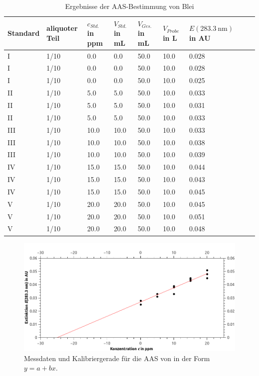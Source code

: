   \begin{table}[H]
    \centering
    \caption[Ergebnisse AAS, Quelle: Autor]{Ergebnisse der AAS-Bestimmung von Blei}
    
    \label{tab:ErgebnisseAAS}   
    \begin{tabular}{@{}l|lllll|lp{4.5cm}l@{}}
      \toprule
      Standard & aliquoter Teil & $c_{Std.}$ in \si{ppm} & $V_{Std.}$ in \si{\milli\liter} & $V_{Ges.}$ in \si{\milli\liter} & $V_{Probe}$ in \si{\liter} & $E\left(\SI[mode=text]{283.3}{\nano\meter}\right)$ in AU \\ \midrule
        I & 1/10 & 0.0 & 0.0 & 50.0 & 10.0 & 0.028 \\
        I & 1/10 & 0.0 & 0.0 & 50.0 & 10.0 & 0.028 \\
        I & 1/10 & 0.0 & 0.0 & 50.0 & 10.0 & 0.025 \\
       II & 1/10 & 5.0 & 5.0 & 50.0 & 10.0 & 0.033 \\
       II & 1/10 & 5.0 & 5.0 & 50.0 & 10.0 & 0.031 \\
       II & 1/10 & 5.0 & 5.0 & 50.0 & 10.0 & 0.033 \\
     III  & 1/10 & 10.0 & 10.0 & 50.0 & 10.0 & 0.033 \\
     III  & 1/10 & 10.0 & 10.0 & 50.0 & 10.0 & 0.038 \\
     III  & 1/10 & 10.0 & 10.0 & 50.0 & 10.0 & 0.039 \\
       IV & 1/10 & 15.0 & 15.0 & 50.0 & 10.0 & 0.044 \\
       IV & 1/10 & 15.0 & 15.0 & 50.0 & 10.0 & 0.043 \\
       IV & 1/10 & 15.0 & 15.0 & 50.0 & 10.0 & 0.045 \\
        V & 1/10 & 20.0 & 20.0 & 50.0 & 10.0 & 0.045 \\
        V & 1/10 & 20.0 & 20.0 & 50.0 & 10.0 & 0.051 \\
        V & 1/10 & 20.0 & 20.0 & 50.0 & 10.0 & 0.048 \\ \bottomrule
    \end{tabular}
  \end{table}
  
  \begin{figure}[H]
    \includegraphics[scale=0.5, center]{images/KalibriergeradeAASPb.png} 
    \caption[Messdaten und Kalibriergerade für die AAS von , Quelle: Autor]{Messdaten und Kalibriergerade für die AAS von  in der Form $y = a + bx$.}
    \label{fig:KalibriergeradeBlei}
  \end{figure}
